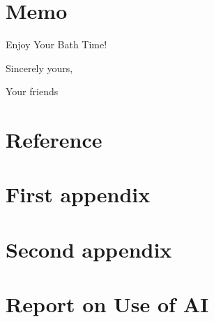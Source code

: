 \documentclass{mcmthesis}
\begin{document}
\newpage
\section*{Memo} %

\begin{letter}{Enjoy Your Bath Time!}


\vspace{\parskip}

Sincerely yours,

Your friends

\end{letter}










\newpage
\section*{Reference} %
\printbibliography




\begin{appendices}
\section{First appendix}
\section{Second appendix}
\end{appendices}




\newpage
{}
\setcounter{lastpage}{\value{page}}
\thispagestyle{empty} 

\section*{Report on Use of AI}
\end{document}
